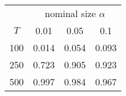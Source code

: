 % 
\begin{tabular}{cccc}
  \hline
  & \multicolumn{3}{c}{nominal size $\alpha$} \\
 $T$ & 0.01 & 0.05 & 0.1 \\
 \hline
100 & 0.014 & 0.054 & 0.093 \\ 
  250 & 0.723 & 0.905 & 0.923 \\ 
  500 & 0.997 & 0.984 & 0.967 \\ 
   \hline
\end{tabular}
